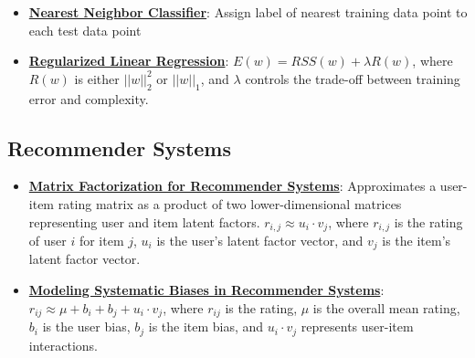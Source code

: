 \documentclass{article}%
\begin{document}
\begin{itemize}[leftmargin=*]
\item \href{https://purdue.brightspace.com/d2l/common/assets/pdfjs-d2l-dist/1.0.14-legacy/web/viewer.html?file=\%2Fcontent\%2Fenforced\%2F1095467-wl.202510.CS.24300.001\%2F07L2-Vision.pdf\%3Fou\%3D1095467\&lang=en-us\&container=d2l-fileviewer-rendered-pdf\&fullscreen=d2l-fileviewer-rendered-pdf-dialog\&height=667#page=30}{\textbf{Nearest Neighbor Classifier}}: Assign label of nearest training data point to each test data point%
\item \href{https://purdue.brightspace.com/d2l/common/assets/pdfjs-d2l-dist/1.0.14-legacy/web/viewer.html?file=\%2Fcontent\%2Fenforced\%2F1095467-wl.202510.CS.24300.001\%2F10L1-CrossValidation.pdf\%3Fou\%3D1095467\&lang=en-us\&container=d2l-fileviewer-rendered-pdf\&fullscreen=d2l-fileviewer-rendered-pdf-dialog\&height=667#page=17}{\textbf{Regularized Linear Regression}}: $E(w) = RSS(w) + \lambda R(w)$, where $R(w)$ is either $||w||_2^2$ or $||w||_1$, and $\lambda$ controls the trade-off between training error and complexity.%
\end{itemize}

%
\subsection{Recommender Systems}%
\label{subsec:RecommenderSystems}%
\begin{itemize}[leftmargin=*]%
\item \href{https://purdue.brightspace.com/d2l/common/assets/pdfjs-d2l-dist/1.0.14-legacy/web/viewer.html?file=\%2Fcontent\%2Fenforced\%2F1095467-wl.202510.CS.24300.001\%2F11L2-svd-pca-recommender.pdf\%3Fou\%3D1095467\&lang=en-us\&container=d2l-fileviewer-rendered-pdf\&fullscreen=d2l-fileviewer-rendered-pdf-dialog\&height=667#page=36}{\textbf{Matrix Factorization for Recommender Systems}}: Approximates a user-item rating matrix as a product of two lower-dimensional matrices representing user and item latent factors. $r_{i,j} \approx u_i \cdot v_j$, where $r_{i,j}$ is the rating of user $i$ for item $j$, $u_i$ is the user's latent factor vector, and $v_j$ is the item's latent factor vector.%
\item \href{https://purdue.brightspace.com/d2l/common/assets/pdfjs-d2l-dist/1.0.14-legacy/web/viewer.html?file=\%2Fcontent\%2Fenforced\%2F1095467-wl.202510.CS.24300.001\%2F11L2-svd-pca-recommender.pdf\%3Fou\%3D1095467\&lang=en-us\&container=d2l-fileviewer-rendered-pdf\&fullscreen=d2l-fileviewer-rendered-pdf-dialog\&height=667#page=44}{\textbf{Modeling Systematic Biases in Recommender Systems}}: $r_{ij} \approx \mu + b_i + b_j + u_i \cdot v_j$, where $r_{ij}$ is the rating, $\mu$ is the overall mean rating, $b_i$ is the user bias, $b_j$ is the item bias, and $u_i \cdot v_j$ represents user-item interactions.%
\end{itemize}
\end{document}
